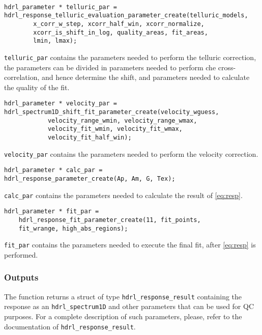 \begin{lstlisting}

hdrl_parameter * telluric_par = 
hdrl_response_telluric_evaluation_parameter_create(telluric_models,
        x_corr_w_step, xcorr_half_win, xcorr_normalize, 
        xcorr_is_shift_in_log, quality_areas, fit_areas, 
        lmin, lmax);
\end{lstlisting}


\verb+telluric_par+ contains the parameters needed to perform the telluric correction, the parameters can be divided in parameters needed to perform che cross-correlation, and hence determine the shift, and parameters needed to calculate the quality of the fit.



\begin{lstlisting}
hdrl_parameter * velocity_par = 
hdrl_spectrum1D_shift_fit_parameter_create(velocity_wguess,
    		velocity_range_wmin, velocity_range_wmax, 
    		velocity_fit_wmin, velocity_fit_wmax, 
    		velocity_fit_half_win);
\end{lstlisting}


\verb+velocity_par+ contains the parameters needed to perform the velocity correction.



\begin{lstlisting}
hdrl_parameter * calc_par = 
hdrl_response_parameter_create(Ap, Am, G, Tex);
\end{lstlisting}


\verb+calc_par+ contains the parameters needed to calculate the result of \ref{eq:resp}.



\begin{lstlisting}
hdrl_parameter * fit_par =
    hdrl_response_fit_parameter_create(11, fit_points, 
	fit_wrange, high_abs_regions);
\end{lstlisting}


\verb+fit_par+ contains the parameters needed to execute the final fit, after \ref{eq:resp} is performed.




\subsubsection{Outputs}
The function returns a struct of type \verb+hdrl_response_result+ containing the response as an \verb+hdrl_spectrum1D+ and other parameters that can be used for QC purposes. For a complete description of such parameters, please, refer to the documentation of \verb+hdrl_response_result+.


